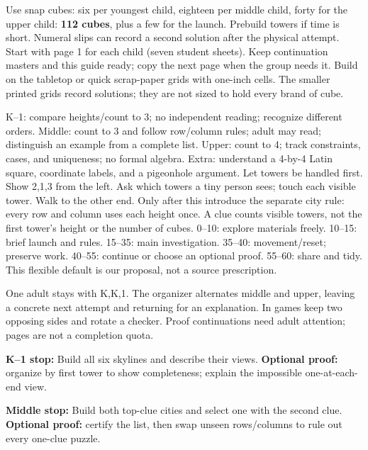 \documentclass[11pt]{article}
\begin{document}
Use snap cubes: six per youngest child, eighteen per middle child, forty for the upper child: \textbf{112 cubes}, plus a few for the launch. Prebuild towers if time is short. Numeral slips can record a second solution after the physical attempt. Start with page 1 for each child (seven student sheets). Keep continuation masters and this guide ready; copy the next page when the group needs it. Build on the tabletop or quick scrap-paper grids with one-inch cells. The smaller printed grids record solutions; they are not sized to hold every brand of cube.

K--1: compare heights/count to 3; no independent reading; recognize different orders. Middle: count to 3 and follow row/column rules; adult may read; distinguish an example from a complete list. Upper: count to 4; track constraints, cases, and uniqueness; no formal algebra. Extra: understand a 4-by-4 Latin square, coordinate labels, and a pigeonhole argument.
Let towers be handled first. Show 2,1,3 from the left. Ask which towers a tiny person sees; touch each visible tower. Walk to the other end. Only after this introduce the separate city rule: every row and column uses each height once. A clue counts visible towers, not the first tower's height or the number of cubes.
0--10: explore materials freely. 10--15: brief launch and rules. 15--35: main investigation. 35--40: movement/reset; preserve work. 40--55: continue or choose an optional proof. 55--60: share and tidy. This flexible default is our proposal, not a source prescription.

One adult stays with K,K,1. The organizer alternates middle and upper, leaving a concrete next attempt and returning for an explanation. In games keep two opposing sides and rotate a checker. Proof continuations need adult attention; pages are not a completion quota.

\textbf{K--1 stop:} Build all six skylines and describe their views. \textbf{Optional proof:} organize by first tower to show completeness; explain the impossible one-at-each-end view.

\textbf{Middle stop:} Build both top-clue cities and select one with the second clue. \textbf{Optional proof:} certify the list, then swap unseen rows/columns to rule out every one-clue puzzle.
\end{document}

